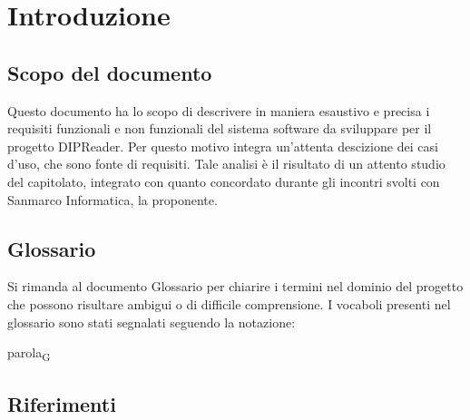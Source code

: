 \documentclass[a4paper,12pt]{article}
\begin{document}
    \tableofcontents
    \newpage

    \listoffigures
    \newpage
    
    \listoftables
    \newpage

    \section{Introduzione} {
        \subsection{Scopo del documento} {        
            Questo documento ha lo scopo di descrivere in maniera esaustivo e precisa i requisiti funzionali e non funzionali del sistema software da sviluppare per il progetto DIPReader. Per questo motivo integra un'attenta descizione dei casi d'uso, che sono fonte di requisiti.
            Tale analisi è il risultato di un attento studio del capitolato, integrato con quanto concordato durante gli incontri svolti con Sanmarco Informatica, la proponente.
        }
        \subsection{Glossario} {
            Si rimanda al documento Glossario per chiarire i termini nel dominio del progetto che possono risultare ambigui o di difficile comprensione. I vocaboli presenti nel glossario sono stati segnalati seguendo la notazione:
            \begin{center}
                parola\textsubscript{G}
            \end{center}
        }
        \subsection{Riferimenti} {
}}
\end{document}

